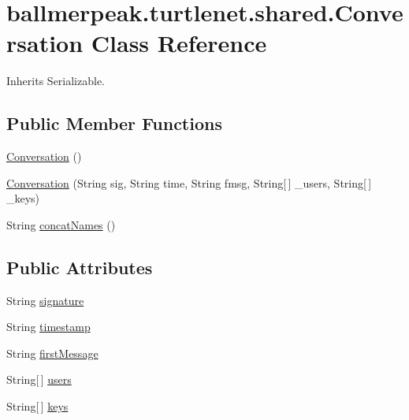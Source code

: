 \hypertarget{classballmerpeak_1_1turtlenet_1_1shared_1_1Conversation}{\section{ballmerpeak.\-turtlenet.\-shared.\-Conversation Class Reference}
\label{classballmerpeak_1_1turtlenet_1_1shared_1_1Conversation}
}


Inherits Serializable.

\subsection*{Public Member Functions}
\begin{DoxyCompactItemize}
\item 
\hyperlink{classballmerpeak_1_1turtlenet_1_1shared_1_1Conversation_ad6b4ff24aaeabe79a889e7ec35ea6176}{Conversation} ()
\item 
\hyperlink{classballmerpeak_1_1turtlenet_1_1shared_1_1Conversation_aa3742f0590d5fd167e4d20a9c2c633c1}{Conversation} (String sig, String time, String fmsg, String\mbox{[}$\,$\mbox{]} \-\_\-users, String\mbox{[}$\,$\mbox{]} \-\_\-keys)
\item 
String \hyperlink{classballmerpeak_1_1turtlenet_1_1shared_1_1Conversation_aff19390d872b7cc4fe5de755cf2a821e}{concat\-Names} ()
\end{DoxyCompactItemize}
\subsection*{Public Attributes}
\begin{DoxyCompactItemize}
\item 
String \hyperlink{classballmerpeak_1_1turtlenet_1_1shared_1_1Conversation_a27bf5eadc5e4a46d79125a2c6b7be9f8}{signature}
\item 
String \hyperlink{classballmerpeak_1_1turtlenet_1_1shared_1_1Conversation_a4b23ef60e0fef247b74eeba61a85036f}{timestamp}
\item 
String \hyperlink{classballmerpeak_1_1turtlenet_1_1shared_1_1Conversation_a3529815cfaa34a63e188ff968c54a70c}{first\-Message}
\item 
String\mbox{[}$\,$\mbox{]} \hyperlink{classballmerpeak_1_1turtlenet_1_1shared_1_1Conversation_a83edd678b2620b5487fb9a93d52b285e}{users}
\item 
String\mbox{[}$\,$\mbox{]} \hyperlink{classballmerpeak_1_1turtlenet_1_1shared_1_1Conversation_af74acc5c9a1d9275fc452171952707f0}{keys}
\end{DoxyCompactItemize}


